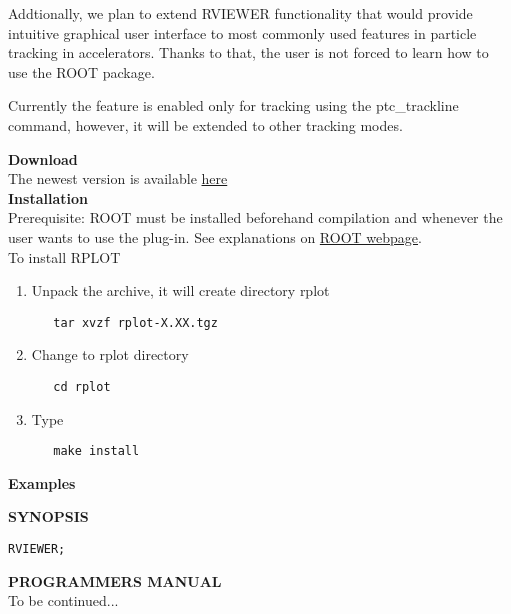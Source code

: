 \begin{description}
Addtionally, we plan to extend RVIEWER functionality that would provide
intuitive graphical user interface to most commonly used       features
in particle tracking in accelerators. Thanks to that,       the user is
not forced to learn how to use the ROOT package.    

Currently the feature is enabled only for tracking using        the
ptc\_trackline command, however, it will be extended to       other
tracking modes.           
\end{description}

\textbf{ Download } \\
The newest version is available \href{download/}{ here }\\

\textbf{ Installation }\\
Prerequisite: ROOT must be installed beforehand compilation and whenever
the user wants to use the plug-in. See explanations on
\href{http://root.cern.ch}{ROOT webpage}.  \\ 

To install RPLOT 
\begin{enumerate}
   \item  Unpack the archive, it will create directory rplot    
\begin{verbatim}
   tar xvzf rplot-X.XX.tgz
\end{verbatim}

   \item Change to rplot directory    
\begin{verbatim}
   cd rplot
\end{verbatim}

   \item Type     
\begin{verbatim}
   make install
\end{verbatim}
\end{enumerate}

\textbf{ Examples}


\textbf{SYNOPSIS}
\begin{verbatim}
RVIEWER; 
\end{verbatim}


\textbf{ PROGRAMMERS MANUAL  } \\

 To be continued... 

